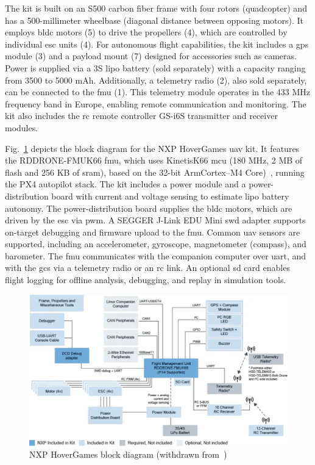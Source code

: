 The kit is built on an S500 carbon fiber frame with four rotors (quadcopter) and
has a 500-millimeter wheelbase (diagonal distance between opposing motors). It
employs \gls{bldc} motors (5) to drive the propellers (4), which are controlled
by individual \gls{esc} units (4).
%
For autonomous flight capabilities, the kit includes a \gls{gps} module (3) and a payload mount (7) designed for accessories such as cameras. Power is supplied via a 3S \gls{lipo} battery (sold separately) with a capacity ranging from 3500 to 5000 mAh.
%
Additionally, a telemetry radio (2), also sold separately, can be connected to
the \gls{fmu} (1). This telemetry module operates in the 433 MHz frequency band
in Europe, enabling remote communication and monitoring.
%
The kit also includes the \gls{rc} remote
controller GS-i6S transmitter and receiver modules.

Fig.~\ref{fig:hoverGames-blkDiag} depicts the block diagram for the NXP
HoverGames \gls{uav} kit.  It features the RDDRONE-FMUK66 \gls{fmu}, which uses 
Kinetis\textreg K66 \gls{mcu} (180 MHz, 2 MB of flash and 256 KB of \gls{sram}), based on
the 32-bit Arm\textreg Cortex\textreg--M4 Core)~\cite{nxp-hoverGames-fmu},
running the PX4 autopilot stack.
%
The kit includes a power module and a power-distribution board with current and
voltage sensing to estimate \gls{lipo} battery autonomy. The power-distribution
board supplies the \gls{bldc} motors, which are driven by the \gls{esc} via
\gls{pwm}. A SEGGER J-Link EDU Mini \gls{swd} adapter supports on-target
debugging and firmware upload to the \gls{fmu}.
%
Common \gls{uav} sensors are supported, including an accelerometer, gyroscope,
magnetometer (compass), and barometer. The \gls{fmu} communicates with the
companion computer over \gls{uart}, and with the \gls{gcs} via a telemetry radio
or an \gls{rc} link. An optional \gls{sd} card enables flight logging for
offline analysis, debugging, and replay in simulation tools.

\begin{figure}[!hbt]
  \centering
  \includegraphics[width=1.0\textwidth]{./img/pdf/hoverGames-blkDiag.pdf} 
  \caption[NXP HoverGames block diagram]{NXP HoverGames block diagram (withdrawn from~\cite{nxp-hoverGames-uav})\footnotemark}%
  \label{fig:hoverGames-blkDiag}
\end{figure}
%


